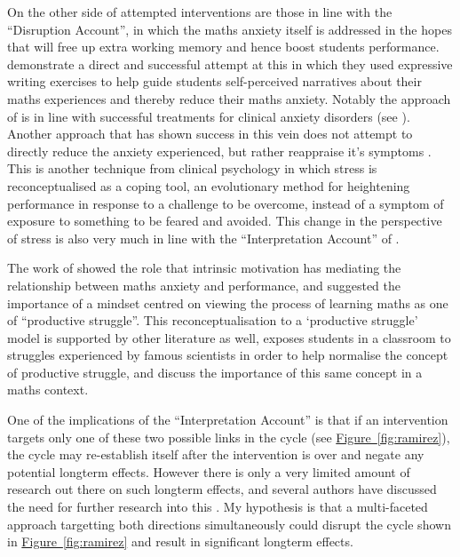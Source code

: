 \documentclass[twoside,12pt,a4paper]{report}
\newcommand{\reffig}[1]{\hyperref[fig:#1]{Figure~\ref{fig:#1}}}
\begin{document}
On the other side of attempted interventions are those in line with the ``Disruption Account'', in which the maths anxiety itself is addressed in the hopes that will free up extra working memory and hence boost students performance.   demonstrate a direct and successful attempt at this in which they used expressive writing exercises to help guide students self-perceived narratives about their maths experiences and thereby reduce their maths anxiety. Notably the approach of  is in line with successful treatments for clinical anxiety disorders (see ). Another approach that has shown success in this vein does not attempt to directly reduce the anxiety experienced, but rather reappraise it's symptoms \cite{Jamieson2016}. This is another technique from clinical psychology in which stress is reconceptualised as a coping tool, an evolutionary method for heightening performance in response to a challenge to be overcome, instead of a symptom of exposure to something to be feared and avoided. This change in the perspective of stress is also very much in line with the ``Interpretation Account'' of .

The work of  showed the role that intrinsic motivation has mediating the relationship between maths anxiety and performance, and suggested the importance of a mindset centred on viewing the process of learning maths as one of ``productive struggle''. This reconceptualisation to a `productive struggle' model is supported by other literature as well,  exposes students in a classroom to struggles experienced by famous scientists in order to help normalise the concept of productive struggle, and  discuss the importance of this same concept in a maths context.

One of the implications of the ``Interpretation Account'' is that if an intervention targets only one of these two possible links in the cycle (see \reffig{ramirez}), the cycle may re-establish itself after the intervention is over and negate any potential longterm effects. However there is only a very limited amount of research out there on such longterm effects, and several authors have discussed the need for further research into this \cite{Pellicioni2016,Chang2016}. My hypothesis is that a multi-faceted approach targetting both directions simultaneously could disrupt the cycle shown in \reffig{ramirez} and result in significant longterm effects.
\end{document}
